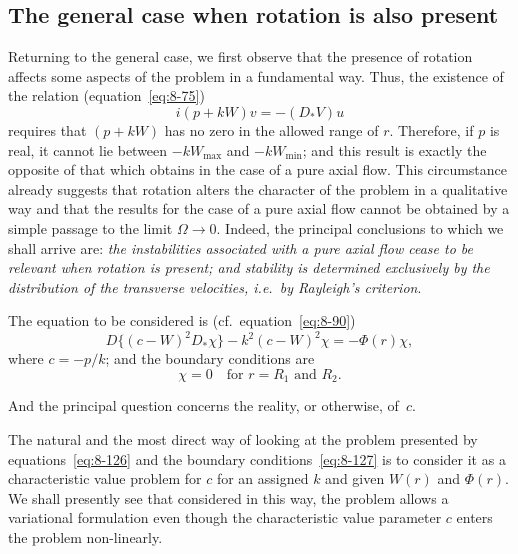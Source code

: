 \subsection{The general case when rotation is also present}
\label{sec:78b}

Returning to the general case, we first observe that the presence of rotation affects some aspects of the problem in a fundamental way. Thus, the existence of the relation (equation~\eqref{eq:8-75})
\begin{equation}
\label{eq:8-125}
i(p+kW)v = -(D_*V)u
\end{equation}
requires that $(p+kW)$ has no zero in the allowed range of $r$. Therefore, if $p$ is real, it cannot lie between $-kW_{\max}$ and $-kW_{\min}$; and this result is exactly the opposite of that which obtains in the case of a pure axial flow. This circumstance already suggests that rotation alters the character of the problem in a qualitative way and that the results for the case of a pure axial flow cannot be obtained by a simple passage to the limit $\Omega \to 0$. Indeed, the principal conclusions to which we shall arrive are: \emph{the instabilities associated with a pure axial flow cease to be relevant when rotation is present; and stability is determined exclusively by the distribution of the transverse velocities, i.e.\ by Rayleigh's criterion}.

The equation to be considered is (cf.\ equation~\eqref{eq:8-90})
\begin{equation}
\label{eq:8-126}
D\bigl\{(c-W)^2 D_*\chi\bigr\} - k^2(c-W)^2\chi = -\Phi(r)\chi,
\end{equation}
where $c = -p/k$; and the boundary conditions are
\begin{equation}
\label{eq:8-127}
\chi = 0 \quad \text{for } r = R_1 \text{ and } R_2.
\end{equation}

And the principal question concerns the reality, or otherwise, of~$c$.

The natural and the most direct way of looking at the problem presented by equations~\eqref{eq:8-126} and the boundary conditions~\eqref{eq:8-127} is to consider it as a characteristic value problem for $c$ for an assigned $k$ and given $W(r)$ and $\Phi(r)$. We shall presently see that considered in this way, the problem allows a variational formulation even though the characteristic value parameter $c$ enters the problem non-linearly.

